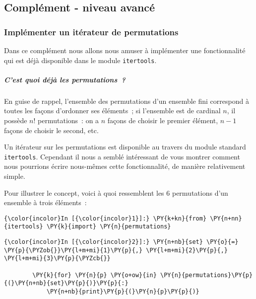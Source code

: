     
    
    
    

    

    \hypertarget{compluxe9ment---niveau-avancuxe9}{%
\subsection{Complément - niveau
avancé}\label{compluxe9ment---niveau-avancuxe9}}

    \hypertarget{impluxe9menter-un-ituxe9rateur-de-permutations}{%
\subsubsection{Implémenter un itérateur de
permutations}\label{impluxe9menter-un-ituxe9rateur-de-permutations}}

    Dans ce complément nous allons nous amuser à implémenter une
fonctionnalité qui est déjà disponible dans le module
\texttt{itertools}.

    \hypertarget{cest-quoi-duxe9juxe0-les-permutations}{%
\subparagraph{C'est quoi déjà les
permutations~?}\label{cest-quoi-duxe9juxe0-les-permutations}}

    En guise de rappel, l'ensemble des permutations d'un ensemble fini
correspond à toutes les façons d'ordonner ses éléments~; si l'ensemble
est de cardinal \(n\), il possède \(n!\) permutations~: on a \(n\)
façons de choisir le premier élément, \(n-1\) façons de choisir le
second, etc.

    Un itérateur sur les permutations est disponible au travers du module
standard \texttt{itertools}. Cependant il nous a semblé intéressant de
vous montrer comment nous pourrions écrire nous-mêmes cette
fonctionnalité, de manière relativement simple.

    Pour illustrer le concept, voici à quoi ressemblent les 6 permutations
d'un ensemble à trois éléments~:

    \begin{Verbatim}[commandchars=\\\{\}]
{\color{incolor}In [{\color{incolor}1}]:} \PY{k+kn}{from} \PY{n+nn}{itertools} \PY{k}{import} \PY{n}{permutations}
\end{Verbatim}


    \begin{Verbatim}[commandchars=\\\{\}]
{\color{incolor}In [{\color{incolor}2}]:} \PY{n+nb}{set} \PY{o}{=} \PY{p}{\PYZob{}}\PY{l+m+mi}{1}\PY{p}{,} \PY{l+m+mi}{2}\PY{p}{,} \PY{l+m+mi}{3}\PY{p}{\PYZcb{}}
        
        \PY{k}{for} \PY{n}{p} \PY{o+ow}{in} \PY{n}{permutations}\PY{p}{(}\PY{n+nb}{set}\PY{p}{)}\PY{p}{:}
            \PY{n+nb}{print}\PY{p}{(}\PY{n}{p}\PY{p}{)}
\end{Verbatim}


